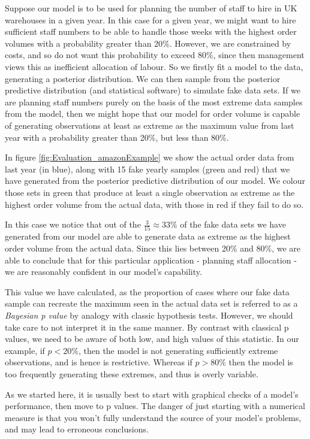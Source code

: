 \documentclass[11pt,fullpage]{book}
\begin{document}
Suppose our model is to be used for planning the number of staff to hire in UK warehouses in a given year. In this case for a given year, we might want to hire sufficient staff numbers to be able to handle those weeks with the highest order volumes with a probability greater than 20\%. However, we are constrained by costs, and so do not want this probability to exceed 80\%, since then management views this as inefficient allocation of labour. So we firstly fit a model to the data, generating a posterior distribution. We can then sample from the posterior predictive distribution (and statistical software) to simulate fake data sets. If we are planning staff numbers purely on the basis of the most extreme data samples from the model, then we might hope that our model for order volume is capable of generating observations at least as extreme as the maximum value from last year with a probability greater than 20\%, but less than 80\%.

In figure \ref{fig:Evaluation_amazonExample} we show the actual order data from last year (in blue), along with 15 fake yearly samples (green and red) that we have generated from the posterior predictive distribution of our model. We colour those sets in green that produce at least a single observation as extreme as the highest order volume from the actual data, with those in red if they fail to do so. 

In this case we notice that out of the $\frac{3}{15}\approx 33\%$ of the fake data sets we have generated from our model are able to generate data as extreme as the highest order volume from the actual data. Since this lies between 20\% and 80\%, we are able to conclude that for this particular application - planning staff allocation - we are reasonably confident in our model's capability.

This value we have calculated, as the proportion of cases where our fake data sample can recreate the maximum seen in the actual data set is referred to as a \textit{Bayesian p value} by analogy with classic hypothesis tests. However, we should take care to not interpret it in the same manner. By contrast with classical p values, we need to be aware of both low, and high values of this statistic. In our example, if $p<20\%$, then the model is not generating sufficiently extreme observations, and is hence is restrictive. Whereas if $p>80\%$ then the model is too frequently generating these extremes, and thus is overly variable.

As we started here, it is usually best to start with graphical checks of a model's performance, then move to p values. The danger of just starting with a numerical measure is that you won't fully understand the source of your model's problems, and may lead to erroneous conclusions.
\end{document}
